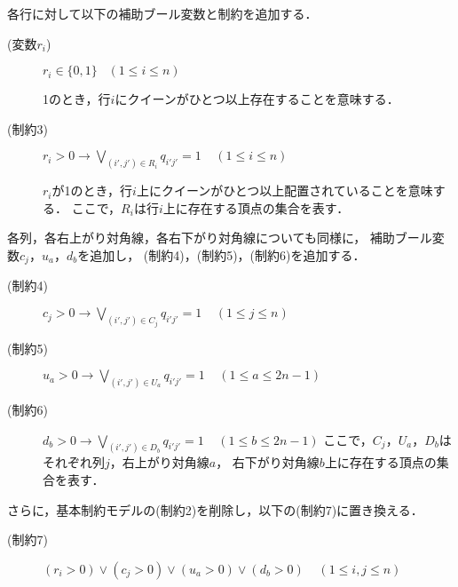 各行に対して以下の補助ブール変数と制約を追加する．
\begin{description}
 \item[(変数$r_i$)] $r_{i} \in \{0,1\} \;\;\; (1 \leq i \leq n)$\par
  1のとき，行$i$にクイーンがひとつ以上存在することを意味する．
 \item[(制約3)] $r_{i}>0 \rightarrow \bigvee\limits_{(i',j')\in R_{i}} q_{i'j'}=1 \;\;\;\; (1 \leq i \leq n)$ \par
  $r_{i}$が1のとき，行$i$上にクイーンがひとつ以上配置されていることを意味する．
  ここで，$R_i$は行$i$上に存在する頂点の集合を表す．
\end{description}
%
各列，各右上がり対角線，各右下がり対角線についても同様に，
補助ブール変数$c_{j}$，$u_{a}$，$d_{b}$を追加し，
(制約4)，(制約5)，(制約6)を追加する．
%
\begin{description}
 \item[(制約4)] $c_{j}>0 \rightarrow \bigvee\limits_{(i',j')\in C_{j}} q_{i'j'}=1 \;\;\;\; (1 \leq j \leq n)$ 
 \item[(制約5)] $u_{a}>0 \rightarrow \bigvee\limits_{(i',j')\in U_{a}} q_{i'j'}=1 \;\;\;\; (1 \leq a \leq 2n-1)$ 
 \item[(制約6)] $d_{b}>0 \rightarrow \bigvee\limits_{(i',j')\in D_{b}} q_{i'j'}=1 \;\;\;\; (1 \leq b \leq 2n-1)$
  ここで，$C_j$，$U_{a}$，$D_{b}$はそれぞれ列$j$，右上がり対角線$a$，
  右下がり対角線$b$上に存在する頂点の集合を表す．
\end{description}

さらに，基本制約モデルの(制約2)を削除し，以下の(制約7)に置き換える．
\begin{description}
 \item[(制約7)] $(r_i > 0) \vee (c_j >0) \vee (u_{a}>0) \vee (d_{b}>0) \;\;\;\; (1 \leq i,j \leq n)$
\end{description}

